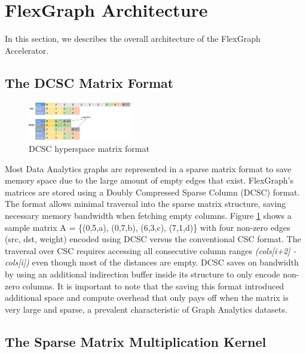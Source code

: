 \section{FlexGraph Architecture}

In this section, we describes the overall architecture of the FlexGraph Accelerator.

\subsection{The DCSC Matrix Format}

\begin{figure}[htbp]
\centering
\includegraphics[width=0.4\textwidth]{figures/DCSC_matrix_format}
\caption{DCSC hyperspace matrix format}
\label{fig:DCSC_matrix_format}
\end{figure}

Most Data Analytics graphs are represented in a sparse matrix format to save memory space due to the large amount of empty edges that exist. FlexGraph's matrices are stored using a Doubly Compressed Sparse Column (DCSC) \cite{DCSC} format. The format allows minimal traversal into the sparse matrix structure, saving necessary memory bandwidth when fetching empty columns. Figure \ref{fig:DCSC_matrix_format} shows a sample matrix A = \{(0,5,a), (0,7,b), (6,3,c), (7,1,d)\} with four non-zero edges (src, dst, weight) encoded using DCSC versus the conventional CSC \cite{CSC} format. The traversal over CSC requires accessing all consecutive column ranges \textit{(cols[i+2] - cols[i])} even though most of the distances are empty. DCSC saves on bandwidth by using an additional indirection  buffer inside its structure to only encode non-zero columns. It is important to note that the saving this format introduced additional space and compute overhead that only pays off when the matrix is very large and sparse, a prevalent characteristic of Graph Analytics datasets.

\subsection{The Sparse Matrix Multiplication Kernel}

